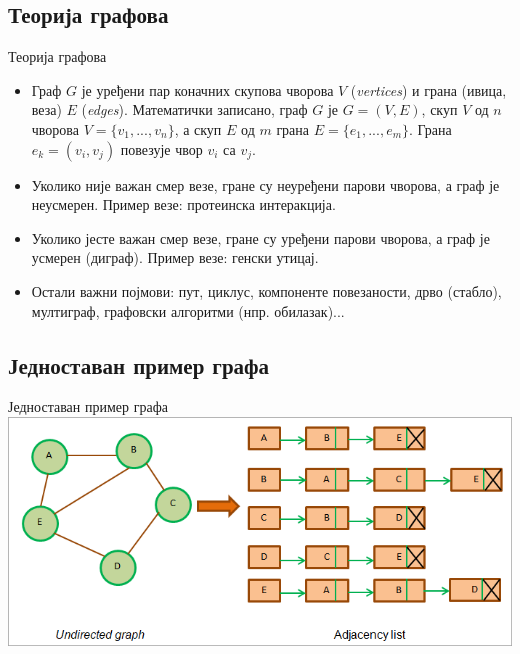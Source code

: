 \documentclass[hyperref={bookmarks=false}]{beamer}
\begin{document}
\subsection{Теорија графова}
\begin{frame}{Теорија графова}
\begin{itemize}
	\item Граф $G$ је уређени пар коначних скупова чворова $V$ (\textit{vertices}) и грана (ивица, веза) $E$ (\textit{edges}). Математички записано, граф $G$ је $G = (V, E)$, скуп $V$ од $n$ чворова $V = \{v_1, ..., v_n\}$, а скуп $E$ од $m$ грана $E = \{e_1, ..., e_m\}$. Грана $e_k = (v_i, v_j)$ повезује чвор $v_i$ са $v_j$.

	\item Уколико није важан смер везе, гране су неуређени парови чворова, а граф је неусмерен. Пример везе: протеинска интеракција.

	\item Уколико јесте важан смер везе, гране су уређени парови чворова, а граф је усмерен (диграф). Пример везе: генски утицај.

	\item Остали важни појмови: пут, циклус, компоненте повезаности, дрво (стабло), мултиграф, графовски алгоритми (нпр. обилазак)...
\end{itemize}
\end{frame}

\subsection{Једноставан пример графа}
\begin{frame}{Једноставан пример графа}
\centering\includegraphics[width=.95\textwidth]{graf.png}
\end{frame}
\end{document}
